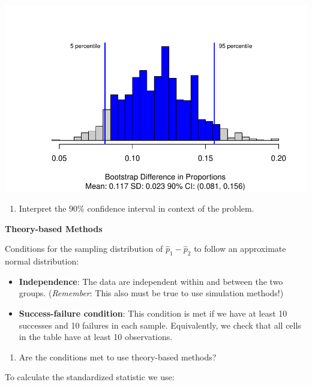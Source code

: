 \documentclass[
]{report}
\providecommand{\tightlist}{%
  \setlength{\itemsep}{0pt}\setlength{\parskip}{0pt}}
\begin{document}
\begin{center}\includegraphics[width=0.7\linewidth]{10-UR-module8_9_review_files/figure-latex/unnamed-chunk-3-1} \end{center}

\begin{enumerate}
\def\labelenumi{\arabic{enumi}.}
\setcounter{enumi}{12}
\tightlist
\item
  Interpret the 90\% confidence interval in context of the problem.
\end{enumerate}

\vspace{0.8in}

\newpage

\textbf{Theory-based Methods}

Conditions for the sampling distribution of \(\hat{p}_1-\hat{p}_2\) to follow an approximate normal distribution:

\begin{itemize}
\item
  \textbf{Independence}: The data are independent within and between the two groups. (\emph{Remember}: This also must be true to use simulation methods!)
\item
  \textbf{Success-failure condition}: This condition is met if we have at least 10 successes and 10 failures in each sample. Equivalently, we check that all cells in the table have at least 10 observations.
\end{itemize}

\begin{enumerate}
\def\labelenumi{\arabic{enumi}.}
\setcounter{enumi}{13}
\tightlist
\item
  Are the conditions met to use theory-based methods?
\end{enumerate}

\vspace{1in}

To calculate the standardized statistic we use:
\end{document}
